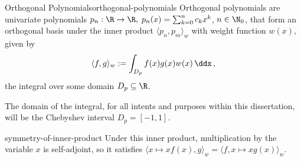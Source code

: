\begin{definition}{Orthogonal Polynomials}{orthogonal-polynomials}
  Orthogonal polynomials are univariate polynomials
  $p_n: \R \to \R, \; p_n(x) = \sum_{k=0}^{n} c_k x^k$, $n \in \N_0$,
  that form an orthogonal basis under the inner product $\langle p_n, p_m \rangle_w$ with weight function $w(x)$, given by
  $$\langle f, g \rangle_w := \int_{D_p} f(x) g(x) w(x) \,\ddx\,,$$
  the integral over some domain $D_p \subseteq \R$.
\end{definition}

The domain of the integral, for all intents and purposes within this dissertation, will be the Chebyshev interval $D_p = [-1, 1]$.

\begin{remark}{}{symmetry-of-inner-product}
  Under this inner product, multiplication by the variable $x$ is self-adjoint, so it satisfies $\langle x\mapsto xf(x), g \rangle_w = \langle f, x \mapsto xg(x)\rangle_w$.
\end{remark}
